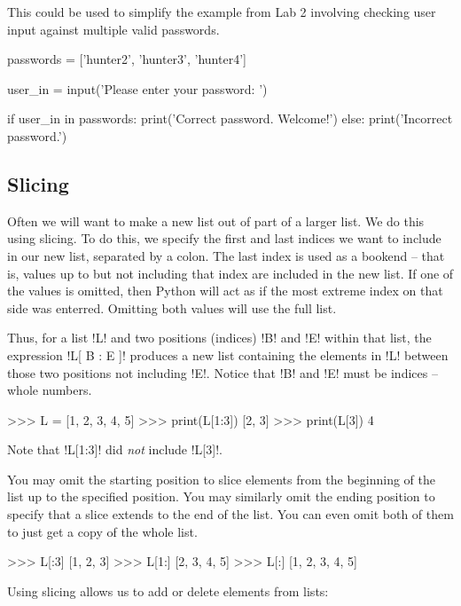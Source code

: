 \documentclass[11pt]{cselabheader}
\begin{document}
This could be used to simplify the example from Lab 2 involving checking user
input against multiple valid passwords.

\begin{python3code}
passwords = ['hunter2', 'hunter3', 'hunter4']

user_in = input('Please enter your password: ')

if user_in in passwords:
    print('Correct password. Welcome!')
else:
    print('Incorrect password.')
\end{python3code}

\subsection{Slicing}
Often we will want to make a new list out of part of a larger list. We do this
using slicing. To do this, we specify the first and last indices we want to
include in our new list, separated by a colon. The last index is used as a
bookend -- that is, values up to but not including that index are included in
the new list. If one of the values is omitted, then Python will act as if the
most extreme index on that side was enterred. Omitting both values will use the
full list.

Thus, for a list \pythoninline!L! and two positions (indices) \pythoninline!B! and
\pythoninline!E! within that list, the expression \pythoninline!L[ B : E ]! produces a
new list containing the elements in \pythoninline!L! between those two positions
not including \pythoninline!E!. Notice that \pythoninline!B! and \pythoninline!E! must be
indices -- whole numbers.

\begin{pyconcode}
>>> L = [1, 2, 3, 4, 5]
>>> print(L[1:3])
[2, 3]
>>> print(L[3])
4
\end{pyconcode}

Note that \pythoninline!L[1:3]! did \emph{not} include \pythoninline!L[3]!. 

You may omit the starting position to slice elements from the beginning of the
list up to the specified position. You may similarly omit the ending position to
specify that a slice extends to the end of the list. You can even omit both of
them to just get a copy of the whole list.

\begin{pyconcode}
>>> L[:3]
[1, 2, 3]
>>> L[1:]
[2, 3, 4, 5]
>>> L[:]
[1, 2, 3, 4, 5]
\end{pyconcode}

Using slicing allows us to add or delete elements from lists:
\end{document}
